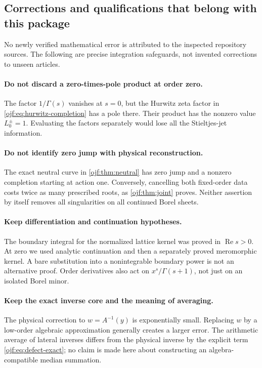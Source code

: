 \documentclass[11pt,a4paper]{article}
\numberwithin{equation}{section}
\theoremstyle{definition}\newtheorem{definition}[theorem]{Definition}
\theoremstyle{remark}\newtheorem{remark}[theorem]{Remark}
\newcommand{\Rea}{\operatorname{Re}}\newcommand{\Ima}{\operatorname{Im}}
\begin{document}
\subsection{Corrections and qualifications that belong with this package}
No newly verified mathematical error is attributed to the inspected
repository sources. The following are precise integration safeguards,
not invented corrections to unseen articles.

\paragraph{Do not discard a zero-times-pole product at order zero.}
The factor $1/\Gamma(s)$ vanishes at $s=0$, but the Hurwitz zeta factor
in \eqref{ojf:eq:hurwitz-completion} has a pole there. Their product
has the nonzero value $L_0^\pm=1$. Evaluating the factors separately
would lose all the Stieltjes-jet information.

\paragraph{Do not identify zero jump with physical reconstruction.}
The exact neutral curve in \cref{ojf:thm:neutral} has zero jump and a
nonzero completion starting at action one. Conversely, cancelling both
fixed-order data costs twice as many prescribed roots, as
\cref{ojf:thm:joint} proves. Neither assertion by itself removes all
singularities on all continued Borel sheets.

\paragraph{Keep differentiation and continuation hypotheses.}
The boundary integral for the normalized lattice kernel was proved in
$\Rea s>0$. At zero we used analytic continuation and then a separately
proved meromorphic kernel. A bare substitution into a nonintegrable
boundary power is not an alternative proof. Order derivatives also act
on $x^s/\Gamma(s+1)$, not just on an isolated Borel minor.

\paragraph{Keep the exact inverse core and the meaning of averaging.}
The physical correction to $w=A^{-1}(y)$ is exponentially small.
Replacing $w$ by a low-order algebraic approximation generally creates
a larger error. The arithmetic average of lateral inverses differs from
the physical inverse by the explicit term
\eqref{ojf:eq:defect-exact}; no claim is made here about constructing
an algebra-compatible median summation.
\end{document}
